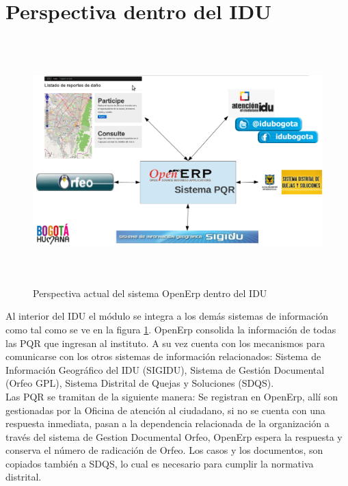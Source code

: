 \section{Perspectiva dentro del IDU}

\begin{figure}[h]
 \includegraphics[width=17cm,height=9.5cm]{./Imagenes/slidesistemacompleto.png}
 \caption{Perspectiva actual del sistema OpenErp dentro del IDU}
 \label{fig:slidesistemacompleto}
\end{figure}

Al interior del IDU el módulo se integra a los demás sistemas de información como tal como se ve en la figura \ref{fig:slidesistemacompleto}. OpenErp consolida la 
información de todas las PQR que ingresan al instituto. A su vez cuenta con los mecanismos para comunicarse con los otros sistemas de información 
relacionados: Sistema de Información Geográfico del IDU (SIGIDU), Sistema de Gestión Documental (Orfeo GPL), Sistema Distrital de 
Quejas y Soluciones (SDQS). \\

Las PQR se tramitan de la siguiente manera: Se registran en OpenErp, allí son gestionadas por la Oficina de atención al ciudadano,
si no se cuenta con una respuesta inmediata, pasan a la dependencia relacionada de la organización a través del
sistema de Gestion Documental Orfeo, OpenErp espera la respuesta y conserva el número de radicación de Orfeo. Los casos y los documentos, son copiados también 
a SDQS, lo cual es necesario para cumplir la normativa distrital.\\

